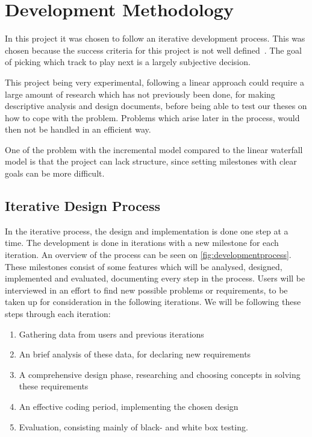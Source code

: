 \chapter{Development Methodology}

In this project it was chosen to follow an iterative development process. This was chosen because the success criteria for this project is not well defined~\cite{dahlbom1993computers}. The goal of picking which track to play next is a largely subjective decision.

This project being very experimental, following a linear approach could require a large amount of research which has not previously been done, for making descriptive analysis and design documents, before being able to test our theses on how to cope with the problem. Problems which arise later in the process, would then not be handled in an efficient way.

One of the problem with the incremental model compared to the linear waterfall model is that the project can lack structure, since setting milestones with clear goals can be more difficult.

\section{Iterative Design Process}
\label{IterativeDesignProcess}
In the iterative process, the design and implementation is done one step at a time. The development is done in iterations with a new milestone for each iteration. An overview of the process can be seen on \cref{fig:developmentprocess}. These milestones consist of some features which will be analysed, designed, implemented and evaluated, documenting every step in the process. Users will be interviewed in an effort to find new possible problems or requirements, to be taken up for consideration in the following iterations. We will be following these steps through each iteration:

\begin{enumerate}
  \item Gathering data from users and previous iterations
  \item An brief analysis of these data, for declaring new requirements
  \item A comprehensive design phase, researching and choosing concepts in solving these requirements
  \item An effective coding period, implementing the chosen design
  \item Evaluation, consisting mainly of black- and white box testing.
\end{enumerate}

